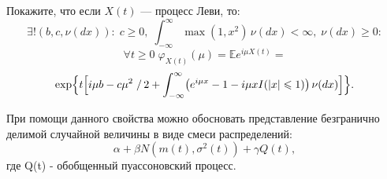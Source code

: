 \begin{problem}
Покажите, что если $X(t)$ --- процесс Леви, то: 
$$
\exists ! (b,c,\nu(dx)): \; 
c\geqslant 0, \; \int_{-\infty}^{\infty} \max(1,x^2)\, \nu(dx)<\infty, \; \nu(dx)\geqslant 0 : 
$$
\[
\forall t\geqslant 0 \;  \varphi_{X(t)}(\mu)={\mathbb E}e^{i\mu X(t)}=  
\]
\[
\exp \Bigl\{ t\Bigl[ i\mu b-c\mu^2\left.\right/2+
\int_{-\infty}^{\infty} \bigl( e^{i\mu x}-1-i\mu x I(|x|\leqslant 1) \bigr)\, \nu(dx) 
\Bigr] \Bigr\} . 
\]

\end{problem}

\begin{remark}
При помощи данного свойства можно обосновать представление безгранично делимой случайной величины в виде смеси распределений: 
\[
\alpha + \beta N(m(t), \sigma^2(t)) + \gamma Q(t),
\]
\noindent где Q(t) - обобщенный пуассоновский процесс.
\end{remark}





